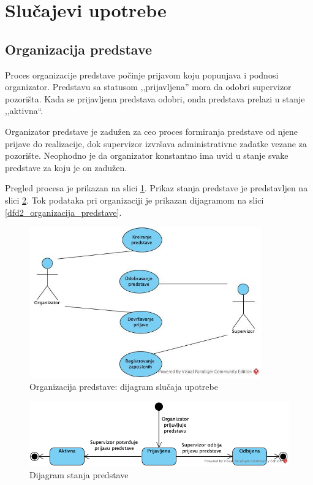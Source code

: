 \documentclass[a4paper]{article}
\begin{document}
\section{Slučajevi upotrebe}

\subsection{Organizacija predstave}
Proces organizacije predstave počinje prijavom koju popunjava i podnosi organizator. Predstavu sa statusom ,,prijavljena'' mora da odobri supervizor pozorišta. Kada se prijavljena predstava odobri, onda predstava prelazi u stanje ,,aktivna``. 

Organizator predstave je zadužen za ceo proces formiranja predstave od njene prijave do realizacije, dok supervizor izvršava administrativne zadatke vezane za pozorište. Neophodno je da organizator konstantno ima uvid u stanje svake predstave za koju je on zadužen. 

Pregled procesa je prikazan na slici \ref{usecase_organizacija_predstave}. Prikaz stanja predstave je predstavljen na slici \ref{state_predstava}. Tok podataka pri organizaciji je prikazan dijagramom na slici \ref{dfd2_organizacija_predstave}. 

\begin{figure}[H]
  \begin{center}
      \includegraphics[width=100mm]{../images/usecase_organizacija_predstave.jpg}
  \end{center}
  \caption{Organizacija predstave: dijagram slučaja upotrebe}
  \label{usecase_organizacija_predstave}
\end{figure}

\begin{figure}[H]
  \begin{center}
      \includegraphics[width=120mm]{../images/state_predstava.png}
  \end{center}
  \caption{Dijagram stanja predstave}
  \label{state_predstava}
\end{figure}
\end{document}
